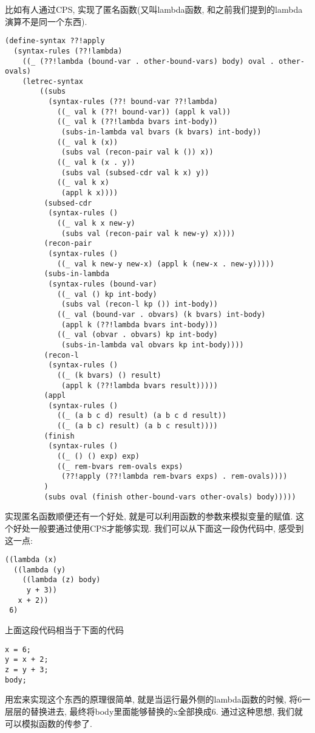 \documentclass{article}
\begin{document}
比如有人通过CPS, 实现了匿名函数(又叫lambda函数, 和之前我们提到的lambda演算不是同一个东西).
\clearpage
\footnotesize
\begin{verbatim}
(define-syntax ??!apply
  (syntax-rules (??!lambda)
    ((_ (??!lambda (bound-var . other-bound-vars) body) oval . other-ovals)
    (letrec-syntax
        ((subs
          (syntax-rules (??! bound-var ??!lambda)
            ((_ val k (??! bound-var)) (appl k val))
            ((_ val k (??!lambda bvars int-body))
             (subs-in-lambda val bvars (k bvars) int-body))
            ((_ val k (x))
             (subs val (recon-pair val k ()) x))
            ((_ val k (x . y))
             (subs val (subsed-cdr val k x) y))
            ((_ val k x)
             (appl k x))))
         (subsed-cdr
          (syntax-rules ()
            ((_ val k x new-y)
             (subs val (recon-pair val k new-y) x))))
         (recon-pair
          (syntax-rules ()
            ((_ val k new-y new-x) (appl k (new-x . new-y)))))
         (subs-in-lambda
          (syntax-rules (bound-var)
            ((_ val () kp int-body)
             (subs val (recon-l kp ()) int-body))
            ((_ val (bound-var . obvars) (k bvars) int-body)
             (appl k (??!lambda bvars int-body)))
            ((_ val (obvar . obvars) kp int-body)
             (subs-in-lambda val obvars kp int-body))))
         (recon-l
          (syntax-rules ()
            ((_ (k bvars) () result)
             (appl k (??!lambda bvars result)))))
         (appl
          (syntax-rules ()
            ((_ (a b c d) result) (a b c d result))
            ((_ (a b c) result) (a b c result))))
         (finish
          (syntax-rules ()
            ((_ () () exp) exp)
            ((_ rem-bvars rem-ovals exps)
             (??!apply (??!lambda rem-bvars exps) . rem-ovals))))
         )
         (subs oval (finish other-bound-vars other-ovals) body)))))
\end{verbatim}
\clearpage
\normalsize
实现匿名函数顺便还有一个好处, 就是可以利用函数的参数来模拟变量的赋值.
这个好处一般要通过使用CPS才能够实现.
我们可以从下面这一段伪代码中, 感受到这一点:
\begin{verbatim}
((lambda (x) 
  ((lambda (y)
    ((lambda (z) body) 
     y + 3))
   x + 2))
 6)
\end{verbatim}
上面这段代码相当于下面的代码
\begin{verbatim}
x = 6;
y = x + 2;
z = y + 3;
body;
\end{verbatim}
用宏来实现这个东西的原理很简单, 就是当运行最外侧的lambda函数的时候, 将6一层层的替换进去,
最终将body里面能够替换的x全部换成6. 通过这种思想, 我们就可以模拟函数的传参了.
\end{document}
